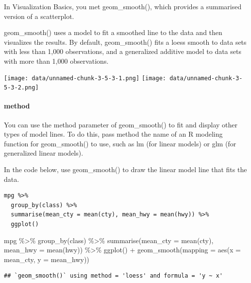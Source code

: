 \documentclass[
]{article}
\newenvironment{Shaded}{\begin{snugshade}}{\end{snugshade}}
\newcommand{\AttributeTok}[1]{\textcolor[rgb]{0.77,0.63,0.00}{#1}}
\newcommand{\FunctionTok}[1]{\textcolor[rgb]{0.00,0.00,0.00}{#1}}
\newcommand{\NormalTok}[1]{#1}
\newcommand{\SpecialCharTok}[1]{\textcolor[rgb]{0.00,0.00,0.00}{#1}}
\begin{document}
In Visualization Basics, you met geom\_smooth(), which provides a
summarised version of a scatterplot.

geom\_smooth() uses a model to fit a smoothed line to the data and then
visualizes the results. By default, geom\_smooth() fits a loess smooth
to data sets with less than 1,000 observations, and a generalized
additive model to data sets with more than 1,000 observations.

\texttt{[image: data/unnamed-chunk-3-5-3-1.png]}
\texttt{[image: data/unnamed-chunk-3-5-3-2.png]}

\hypertarget{method}{%
\paragraph{method}\label{method}}

You can use the method parameter of geom\_smooth() to fit and display
other types of model lines. To do this, pass method the name of an R
modeling function for geom\_smooth() to use, such as lm (for linear
models) or glm (for generalized linear models).

In the code below, use geom\_smooth() to draw the linear model line that
fits the data.

\begin{verbatim}
mpg %>% 
  group_by(class) %>% 
  summarise(mean_cty = mean(cty), mean_hwy = mean(hwy)) %>% 
  ggplot() 
\end{verbatim}

\begin{Shaded}
\begin{Highlighting}[]
\NormalTok{mpg }\SpecialCharTok{\%\textgreater{}\%} 
  \FunctionTok{group\_by}\NormalTok{(class) }\SpecialCharTok{\%\textgreater{}\%} 
  \FunctionTok{summarise}\NormalTok{(}\AttributeTok{mean\_cty =} \FunctionTok{mean}\NormalTok{(cty), }\AttributeTok{mean\_hwy =} \FunctionTok{mean}\NormalTok{(hwy)) }\SpecialCharTok{\%\textgreater{}\%} 
  \FunctionTok{ggplot}\NormalTok{() }\SpecialCharTok{+}
    \FunctionTok{geom\_smooth}\NormalTok{(}\AttributeTok{mapping =} \FunctionTok{aes}\NormalTok{(}\AttributeTok{x =}\NormalTok{ mean\_cty, }\AttributeTok{y =}\NormalTok{ mean\_hwy))}
\end{Highlighting}
\end{Shaded}

\begin{verbatim}
## `geom_smooth()` using method = 'loess' and formula = 'y ~ x'
\end{verbatim}
\end{document}
